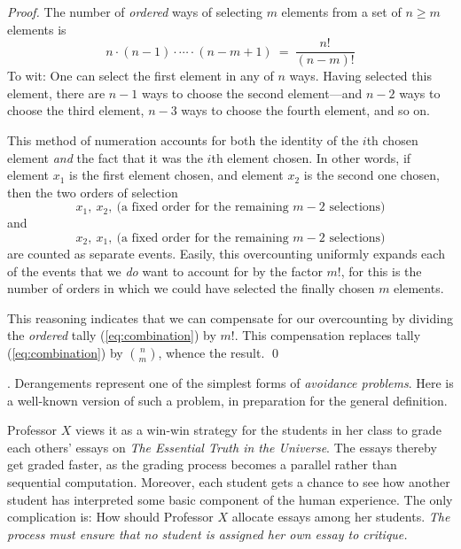\begin{proof}
The number of {\em ordered} ways of selecting $m$ elements from a set of $n \geq m$
elements is 
\begin{equation}
\label{eq:combination}
n \cdot (n-1) \cdot \cdots \cdot (n-m+1) \ = \ \frac{n!}{(n-m)!}
\end{equation}
To wit: One can select the first element in any of $n$ ways.  Having selected this element,
there are $n-1$ ways to choose the second element---and $n-2$ ways to choose the third
element, $n-3$ ways to choose the fourth element, and so on.

This method of numeration accounts for both the identity of the $i$th chosen element 
{\em and} the fact that it was the $i$th element chosen.  In other words, if element $x_1$
is the first element chosen,
and element $x_2$ is the second one chosen, then the two orders of selection
\[ x_1, \ x_2, \ \mbox{(a fixed order for the remaining $m-2$ selections)} \]
and 
\[ x_2, \ x_1, \ \mbox{(a fixed order for the remaining $m-2$ selections)} \]
are counted as separate events.  Easily, this overcounting uniformly expands each of the
events that we {\em do} want to account for by the factor $m!$, for this is the number of orders 
in which we could have selected the finally chosen $m$ elements.
 
This reasoning indicates that we can compensate for our overcounting by dividing the 
{\em ordered} tally (\ref{eq:combination}) by $m!$.  This compensation replaces tally
(\ref{eq:combination}) by $\displaystyle {n \choose m}$, whence the result.  \qed
\end{proof}

\bigskip

.
Derangements represent one of the simplest forms of {\em avoidance problems}.  Here is a
well-known version of such a problem, in preparation for the general definition.

Professor $X$ views it as a win-win strategy for the students in her class to grade each
others' essays on {\it The Essential Truth in the Universe}.  The essays thereby get graded faster,
as the grading process becomes a parallel rather than sequential computation.  Moreover,
each student gets a chance to see how another student has interpreted some basic
component of the human experience.  The only complication is: How should Professor $X$ 
allocate essays among her students.  {\em The process must ensure that no student is assigned her
own essay to critique.}

